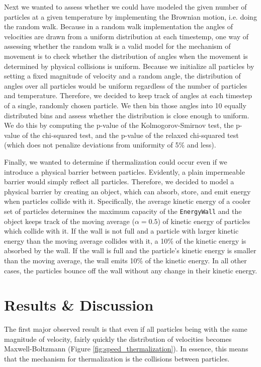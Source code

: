 \documentclass[10pt]{article}
\begin{document}
Next we wanted to assess whether we could have modeled the given number of particles at a given temperature by implementing the Brownian motion, i.e. doing the random walk. Because in a random walk implementation the angles of velocities are drawn from a uniform distribution at each timestemp, one way of assessing whether the random walk is a valid model for the mechanism of movement is to check whether the distribution of angles when the movement is determined by physical collisions is uniform. Because we initialize all particles by setting a fixed magnitude of velocity and a random angle, the distribution of angles over all particles would be uniform regardless of the number of particles and temperature. Therefore, we decided to keep track of angles at each timestep of a single, randomly chosen particle. We then bin those angles into 10 equally distributed bins and assess whether the distribution is close enough to uniform. We do this by computing the p-value of the Kolmogorov-Smirnov test, the p-value of the chi-squared test, and the p-value of the relaxed chi-squared test (which does not penalize deviations from uniformity of 5\% and less).

Finally, we wanted to determine if thermalization could occur even if we introduce a physical barrier between particles. Evidently, a plain impermeable barrier would simply reflect all particles. Therefore, we decided to model a physical barrier by creating an object, which can absorb, store, and emit energy when particles collide with it. Specifically, the average kinetic energy of a cooler set of particles determines the maximum capacity of the \texttt{EnergyWall} and the object keeps track of the moving average ($\alpha=0.5$) of kinetic energy of particles which collide with it. If the wall is not full and a particle with larger kinetic energy than the moving average collides with it, a 10\% of the kinetic energy is absorbed by the wall. If the wall is full and the particle's kinetic energy is smaller than the moving average, the wall emits 10\% of the kinetic energy. In all other cases, the particles bounce off the wall without any change in their kinetic energy.

\section{Results \& Discussion}
\label{sec:results}
The first major observed result is that even if all particles being with the same magnitude of velocity, fairly quickly the distribution of velocities becomes Maxwell-Boltzmann (Figure \ref{fig:speed_thermalization}). In essence, this means that the mechanism for thermalization is the collisions between particles. 
\end{document}
